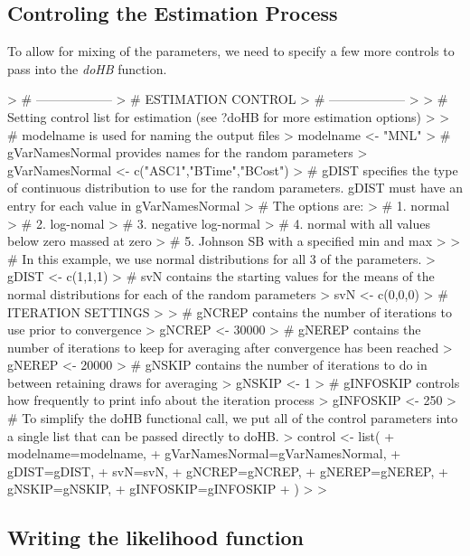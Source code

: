 \documentclass{article}
\begin{document}
\subsection*{Controling the Estimation Process}

To allow for mixing of the parameters, we need to specify a few more controls to pass into the \emph{doHB} function.

\begin{Schunk}
\begin{Sinput}
> # ------------------
> # ESTIMATION CONTROL
> # ------------------
> 
> # Setting control list for estimation (see ?doHB for more estimation options)
> 
> # modelname is used for naming the output files
> modelname <- "MNL"          
> # gVarNamesNormal provides names for the random parameters
> gVarNamesNormal <- c("ASC1","BTime","BCost")
> # gDIST specifies the type of continuous distribution to use for the random parameters. gDIST must have an entry for each value in gVarNamesNormal
> # The options are:
> # 1. normal
> # 2. log-nomal
> # 3. negative log-normal
> # 4. normal with all values below zero massed at zero
> # 5. Johnson SB with a specified min and max
> 
> # In this example, we use normal distributions for all 3 of the parameters.
> gDIST <- c(1,1,1)
> # svN contains the starting values for the means of the normal distributions for each of the random parameters
> svN <- c(0,0,0)  
> # ITERATION SETTINGS
> 
> # gNCREP contains the number of iterations to use prior to convergence
> gNCREP    <- 30000
> # gNEREP contains the number of iterations to keep for averaging after convergence has been reached
> gNEREP    <- 20000             
> # gNSKIP contains the number of iterations to do in between retaining draws for averaging
> gNSKIP    <- 1		       
> # gINFOSKIP controls how frequently to print info about the iteration process
> gINFOSKIP <- 250   
> # To simplify the doHB functional call, we put all of the control parameters into a single list that can be passed directly to doHB.
> control <- list(
+      modelname=modelname,
+      gVarNamesNormal=gVarNamesNormal,
+      gDIST=gDIST,
+      svN=svN,
+      gNCREP=gNCREP,
+      gNEREP=gNEREP,
+      gNSKIP=gNSKIP,
+      gINFOSKIP=gINFOSKIP
+ )
> 
> 
\end{Sinput}
\end{Schunk}

\subsection*{Writing the likelihood function}
\end{document}
